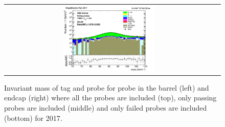 \begin{figure}[htp]
\begin{center}
\begin{tabular}{cc}
      \includegraphics[width=0.45\textwidth]{figures/Zprime/2017/ScaleFactor/SameSign/nominal/stack_mee_Endcap_fail_PUW.png}
    \end{tabular}
    \caption{Invariant mass of tag and probe for probe in the barrel (left) and endcap (right) where all the probes are included (top), only passing probes are included (middle) and only failed probes are included (bottom) for 2017.}
    \label{fig:SS_nominal_mee_2017}
  \end{center}
\end{figure}
